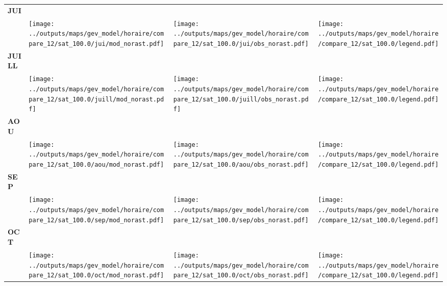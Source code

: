 \documentclass[
  letterpaper,
  DIV=11,
  numbers=noendperiod]{scrartcl}
\begin{document}
\begin{longtable*}{m{2.0cm}m{7.9cm}m{7.9cm}m{1cm}}
\centering \textbf{JUI} \\[0.2em] \begin{tabular}{r@{\hspace{0.2em}}l}\end{tabular} & \centering \texttt{[image: ../outputs/maps/gev\_model/horaire/compare\_12/sat\_100.0/jui/mod\_norast.pdf]} & \centering \texttt{[image: ../outputs/maps/gev\_model/horaire/compare\_12/sat\_100.0/jui/obs\_norast.pdf]} & \centering \texttt{[image: ../outputs/maps/gev\_model/horaire/compare\_12/sat\_100.0/legend.pdf]} \tabularnewline
\centering \textbf{JUILL} \\[0.2em] \begin{tabular}{r@{\hspace{0.2em}}l}\end{tabular} & \centering \texttt{[image: ../outputs/maps/gev\_model/horaire/compare\_12/sat\_100.0/juill/mod\_norast.pdf]} & \centering \texttt{[image: ../outputs/maps/gev\_model/horaire/compare\_12/sat\_100.0/juill/obs\_norast.pdf]} & \centering \texttt{[image: ../outputs/maps/gev\_model/horaire/compare\_12/sat\_100.0/legend.pdf]} \tabularnewline
\centering \textbf{AOU} \\[0.2em] \begin{tabular}{r@{\hspace{0.2em}}l}\end{tabular} & \centering \texttt{[image: ../outputs/maps/gev\_model/horaire/compare\_12/sat\_100.0/aou/mod\_norast.pdf]} & \centering \texttt{[image: ../outputs/maps/gev\_model/horaire/compare\_12/sat\_100.0/aou/obs\_norast.pdf]} & \centering \texttt{[image: ../outputs/maps/gev\_model/horaire/compare\_12/sat\_100.0/legend.pdf]} \tabularnewline
\centering \textbf{SEP} \\[0.2em] \begin{tabular}{r@{\hspace{0.2em}}l}\end{tabular} & \centering \texttt{[image: ../outputs/maps/gev\_model/horaire/compare\_12/sat\_100.0/sep/mod\_norast.pdf]} & \centering \texttt{[image: ../outputs/maps/gev\_model/horaire/compare\_12/sat\_100.0/sep/obs\_norast.pdf]} & \centering \texttt{[image: ../outputs/maps/gev\_model/horaire/compare\_12/sat\_100.0/legend.pdf]} \tabularnewline
\centering \textbf{OCT} \\[0.2em] \begin{tabular}{r@{\hspace{0.2em}}l}\end{tabular} & \centering \texttt{[image: ../outputs/maps/gev\_model/horaire/compare\_12/sat\_100.0/oct/mod\_norast.pdf]} & \centering \texttt{[image: ../outputs/maps/gev\_model/horaire/compare\_12/sat\_100.0/oct/obs\_norast.pdf]} & \centering \texttt{[image: ../outputs/maps/gev\_model/horaire/compare\_12/sat\_100.0/legend.pdf]} \tabularnewline

\end{longtable*}
\end{document}
